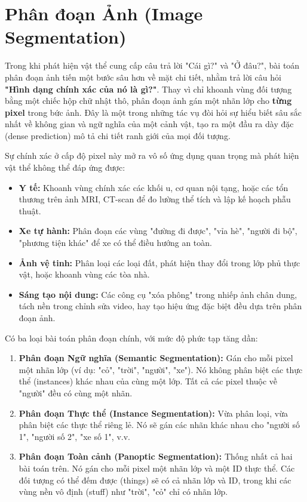 \section{Phân đoạn Ảnh (Image Segmentation)}
\label{sec:image_segmentation}

Trong khi phát hiện vật thể cung cấp câu trả lời "Cái gì?" và "Ở đâu?", bài toán phân đoạn ảnh tiến một bước sâu hơn về mặt chi tiết, nhằm trả lời câu hỏi \textbf{"Hình dạng chính xác của nó là gì?"}. Thay vì chỉ khoanh vùng đối tượng bằng một chiếc hộp chữ nhật thô, phân đoạn ảnh gán một nhãn lớp cho \textbf{từng pixel} trong bức ảnh. Đây là một trong những tác vụ đòi hỏi sự hiểu biết sâu sắc nhất về không gian và ngữ nghĩa của một cảnh vật, tạo ra một đầu ra dày đặc (dense prediction) mô tả chi tiết ranh giới của mọi đối tượng.

Sự chính xác ở cấp độ pixel này mở ra vô số ứng dụng quan trọng mà phát hiện vật thể không thể đáp ứng được:
\begin{itemize}
	\item \textbf{Y tế:} Khoanh vùng chính xác các khối u, cơ quan nội tạng, hoặc các tổn thương trên ảnh MRI, CT-scan để đo lường thể tích và lập kế hoạch phẫu thuật.
	\item \textbf{Xe tự hành:} Phân đoạn các vùng "đường đi được", "vỉa hè", "người đi bộ", "phương tiện khác" để xe có thể điều hướng an toàn.
	\item \textbf{Ảnh vệ tinh:} Phân loại các loại đất, phát hiện thay đổi trong lớp phủ thực vật, hoặc khoanh vùng các tòa nhà.
	\item \textbf{Sáng tạo nội dung:} Các công cụ "xóa phông" trong nhiếp ảnh chân dung, tách nền trong chỉnh sửa video, hay tạo hiệu ứng đặc biệt đều dựa trên phân đoạn ảnh.
\end{itemize}

Có ba loại bài toán phân đoạn chính, với mức độ phức tạp tăng dần:
\begin{enumerate}
	\item \textbf{Phân đoạn Ngữ nghĩa (Semantic Segmentation):} Gán cho mỗi pixel một nhãn lớp (ví dụ: "cỏ", "trời", "người", "xe"). Nó không phân biệt các thực thể (instances) khác nhau của cùng một lớp. Tất cả các pixel thuộc về "người" đều có cùng một nhãn.
	\item \textbf{Phân đoạn Thực thể (Instance Segmentation):} Vừa phân loại, vừa phân biệt các thực thể riêng lẻ. Nó sẽ gán các nhãn khác nhau cho "người số 1", "người số 2", "xe số 1", v.v.
	\item \textbf{Phân đoạn Toàn cảnh (Panoptic Segmentation):} Thống nhất cả hai bài toán trên. Nó gán cho mỗi pixel một nhãn lớp và một ID thực thể. Các đối tượng có thể đếm được (things) sẽ có cả nhãn lớp và ID, trong khi các vùng nền vô định (stuff) như "trời", "cỏ" chỉ có nhãn lớp.
\end{enumerate}

